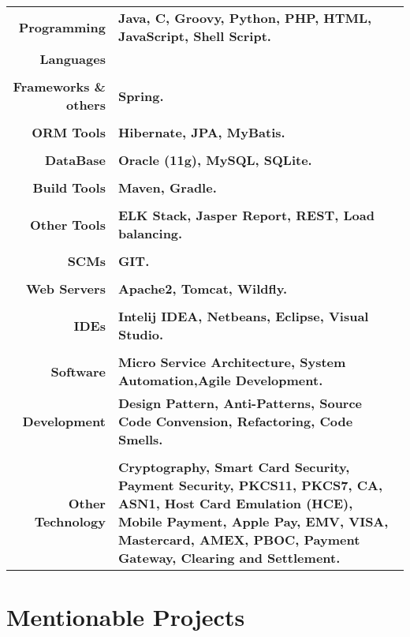 \documentclass[a4paper,10pt]{article}
\begin{document}
\begin{tabular}{r|p{12.5cm}}
	\textbf{Programming}				&\textbf{Java, C, Groovy, Python, PHP, HTML, JavaScript, Shell Script.} \\
	\textbf{Languages}					&\\\\
	\textbf{Frameworks \& others}		&\textbf{Spring.} \\\\
	\textbf{ORM Tools}					&\textbf{Hibernate, JPA, MyBatis.} \\\\
	\textbf{DataBase}					&\textbf{Oracle (11g), MySQL, SQLite.} \\\\
	\textbf{Build Tools}				&\textbf{Maven, Gradle.} \\\\
	\textbf{Other Tools}				&\textbf{ELK Stack, Jasper Report, REST, Load balancing.} \\\\
	\textbf{SCMs}						&\textbf{GIT.} \\\\
	\textbf{Web Servers}				&\textbf{ Apache2, Tomcat, Wildfly.} \\\\
	\textbf{IDEs}						&\textbf{Intelij IDEA, Netbeans, Eclipse, Visual Studio.} \\\\
	\textbf{Software}					&\textbf{Micro Service Architecture, System Automation,Agile Development.}\\
	\textbf{Development}				&\textbf{Design Pattern, Anti-Patterns, Source Code Convension, Re­factoring, Code Smells.} \\\\
	\textbf{Other Technology}			&\textbf{Cryptography, Smart Card Security, Payment Security, PKCS11, PKCS7, CA, ASN1, Host Card Emulation (HCE), Mobile Payment, Apple Pay, EMV, VISA, Mastercard, AMEX, PBOC, Payment Gateway, Clearing and Settlement.} \\
    
\end{tabular}
\section*{Mentionable Projects}
\end{document}
